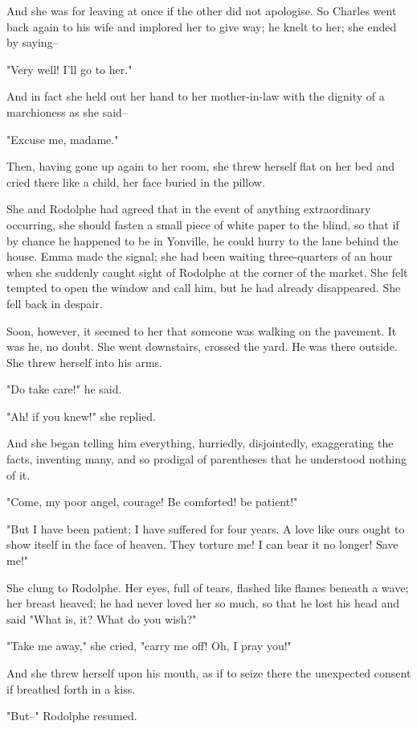 \documentclass{tufte-book}
\begin{document}
And she was for leaving at once if the other did not apologise. So
Charles went back again to his wife and implored her to give way; he
knelt to her; she ended by saying--

"Very well! I'll go to her."

And in fact she held out her hand to her mother-in-law with the dignity
of a marchioness as she said--

"Excuse me, madame."

Then, having gone up again to her room, she threw herself flat on her
bed and cried there like a child, her face buried in the pillow.

She and Rodolphe had agreed that in the event of anything extraordinary
occurring, she should fasten a small piece of white paper to the blind,
so that if by chance he happened to be in Yonville, he could hurry to
the lane behind the house. Emma made the signal; she had been waiting
three-quarters of an hour when she suddenly caught sight of Rodolphe at
the corner of the market. She felt tempted to open the window and call
him, but he had already disappeared. She fell back in despair.

Soon, however, it seemed to her that someone was walking on the
pavement. It was he, no doubt. She went downstairs, crossed the yard. He
was there outside. She threw herself into his arms.

"Do take care!" he said.

"Ah! if you knew!" she replied.

And she began telling him everything, hurriedly, disjointedly,
exaggerating the facts, inventing many, and so prodigal of parentheses
that he understood nothing of it.

"Come, my poor angel, courage! Be comforted! be patient!"

"But I have been patient; I have suffered for four years. A love like
ours ought to show itself in the face of heaven. They torture me! I can
bear it no longer! Save me!"

She clung to Rodolphe. Her eyes, full of tears, flashed like flames
beneath a wave; her breast heaved; he had never loved her so much, so
that he lost his head and said "What is, it? What do you wish?"

"Take me away," she cried, "carry me off! Oh, I pray you!"

And she threw herself upon his mouth, as if to seize there the
unexpected consent if breathed forth in a kiss.

"But--" Rodolphe resumed.
\end{document}
